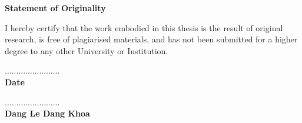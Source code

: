 \begin{center}
	\textbf{\large Statement of Originality}
\end{center}


\noindent I hereby certify that the work embodied in this thesis is the result of original research, is free of plagiarised materials, and has not been submitted for a higher degree to any other University or Institution. \\

\vspace{2in}

\begin{multicols}{2}
    \begin{flushleft}
        ........................ \\
        \textbf{Date}
    \end{flushleft}

    \columnbreak

    \begin{flushright}
        ........................ \\
        \textbf{Dang Le Dang Khoa} \\
    \end{flushright}
\end{multicols}
